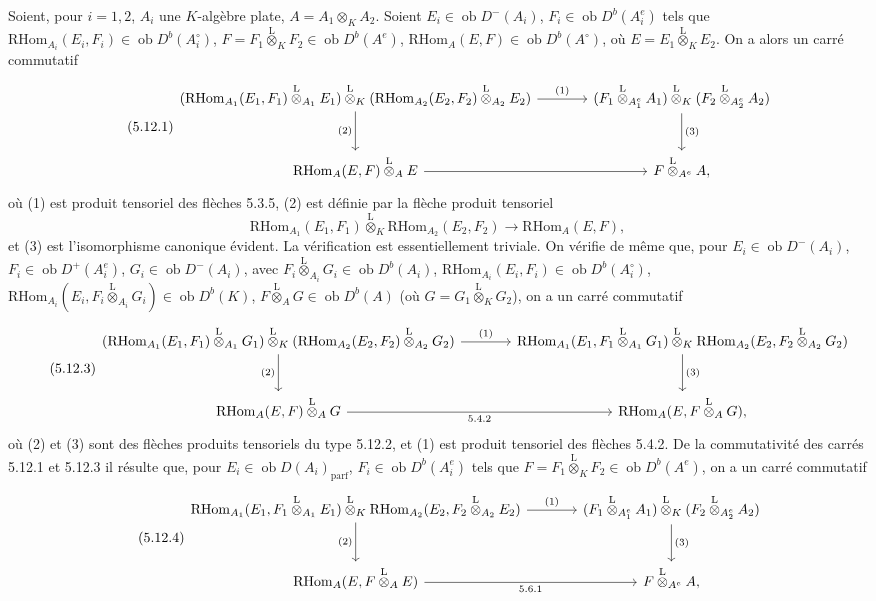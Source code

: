 \documentclass[11pt]{article}
\newcommand{\ob}{\operatorname{ob}}
\providecommand{\RHom}{\mathrm{RHom}}
\providecommand{\lten}{\overset{\mathrm L}{\otimes}}
\providecommand{\RHom}{\mathrm{RHom}}
\providecommand{\ob}{\operatorname{ob}}
\providecommand{\lten}{\overset{\mathrm L}{\otimes}}
\providecommand{\RHom}{\mathrm R\mathcal{H}om}
\providecommand{\lten}{\overset{\mathrm L}{\otimes}}
\providecommand{\lten}{\overset{\mathrm L}{\otimes}}
\providecommand{\lten}{\overset{\mathrm L}{\otimes}}
\providecommand{\lten}{\overset{\mathrm L}{\otimes}}
\begin{document}
Soient, pour $i=1,2$, $A_i$ une $K$-algèbre plate, $A=A_1\otimes_KA_2$. Soient $E_i\in\ob D^-(A_i)$, $F_i\in\ob D^b(A_i^e)$ tels que $\RHom_{A_i}(E_i,F_i)\in\ob D^b(A_i^\circ)$, $F=F_1\lten_KF_2\in\ob D^b(A^e)$, $\RHom_A(E,F)\in\ob D^b(A^\circ)$, où $E=E_1\lten_KE_2$. On a alors un carré commutatif
\begin{equation}\tag{5.12.1}
\begin{tikzcd}[column sep=large,row sep=large]
(\RHom_{A_1}(E_1,F_1)\lten_{A_1}E_1)\lten_K(\RHom_{A_2}(E_2,F_2)\lten_{A_2}E_2) \arrow[r,"(1)"] \arrow[d,"(2)"'] & (F_1\lten_{A_1^e}A_1)\lten_K(F_2\lten_{A_2^e}A_2) \arrow[d,"(3)"]\\
\RHom_A(E,F)\lten_AE \arrow[r] & F\lten_{A^e}A,
\end{tikzcd}
\end{equation}
où (1) est produit tensoriel des flèches 5.3.5, (2) est définie par la flèche produit tensoriel
\begin{equation}\tag{5.12.2}
\RHom_{A_1}(E_1,F_1)\lten_K\RHom_{A_2}(E_2,F_2)\longrightarrow\RHom_A(E,F),
\end{equation}
et (3) est l'isomorphisme canonique évident. La vérification est essentiellement triviale. On vérifie de même que, pour $E_i\in\ob D^-(A_i)$, $F_i\in\ob D^+(A_i^e)$, $G_i\in\ob D^-(A_i)$, avec $F_i\lten_{A_i}G_i\in\ob D^b(A_i)$, $\RHom_{A_i}(E_i,F_i)\in\ob D^b(A_i^\circ)$, $\RHom_{A_i}(E_i,F_i\lten_{A_i}G_i)\in\ob D^b(K)$, $F\lten_AG\in\ob D^b(A)$ (où $G=G_1\lten_KG_2$), on a un carré commutatif
\begin{equation}\tag{5.12.3}
\begin{tikzcd}[column sep=large,row sep=large]
(\RHom_{A_1}(E_1,F_1)\lten_{A_1}G_1)\lten_K(\RHom_{A_2}(E_2,F_2)\lten_{A_2}G_2) \arrow[r,"(1)"] \arrow[d,"(2)"'] & \RHom_{A_1}(E_1,F_1\lten_{A_1}G_1)\lten_K\RHom_{A_2}(E_2,F_2\lten_{A_2}G_2) \arrow[d,"(3)"]\\
\RHom_A(E,F)\lten_AG \arrow[r,"5.4.2"'] & \RHom_A(E,F\lten_AG),
\end{tikzcd}
\end{equation}
où (2) et (3) sont des flèches produits tensoriels du type 5.12.2, et (1) est produit tensoriel des flèches 5.4.2. De la commutativité des carrés 5.12.1 et 5.12.3 il résulte que, pour $E_i\in\ob D(A_i)_{\mathrm{parf}}$, $F_i\in\ob D^b(A_i^e)$ tels que $F=F_1\lten_KF_2\in\ob D^b(A^e)$, on a un carré commutatif
\begin{equation}\tag{5.12.4}
\begin{tikzcd}[column sep=large,row sep=large]
\RHom_{A_1}(E_1,F_1\lten_{A_1}E_1)\lten_K\RHom_{A_2}(E_2,F_2\lten_{A_2}E_2) \arrow[r,"(1)"] \arrow[d,"(2)"'] & (F_1\lten_{A_1^e}A_1)\lten_K(F_2\lten_{A_2^e}A_2) \arrow[d,"(3)"]\\
\RHom_A(E,F\lten_AE) \arrow[r,"5.6.1"'] & F\lten_{A^e}A,
\end{tikzcd}
\end{equation}
\end{document}
